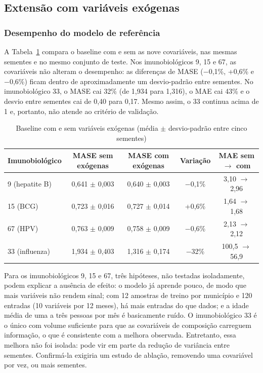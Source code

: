 \documentclass[
    12pt,
    openright,
    oneside,
    a4paper,
    english,
    brazil
]{abntex2}
\begin{document}
\subsection{Extensão com variáveis exógenas}
\label{sec:res_exogenas}

\subsubsection{Desempenho do modelo de referência}

A Tabela~\ref{tab:exogenas} compara o baseline com e sem as nove covariáveis, nas mesmas sementes e no mesmo conjunto de teste. Nos imunobiológicos 9, 15 e 67, as covariáveis não alteram o desempenho: as diferenças de MASE ($-$0,1\%, +0,6\% e $-$0,6\%) ficam dentro de aproximadamente um desvio-padrão entre sementes. No imunobiológico 33, o MASE cai 32\% (de 1,934 para 1,316), o MAE cai 43\% e o desvio entre sementes cai de 0,40 para 0,17. Mesmo assim, o 33 continua acima de 1 e, portanto, não atende ao critério de validação.

\begin{table}[htb]
  \centering
  \caption{Baseline com e sem variáveis exógenas (média $\pm$ desvio-padrão entre cinco sementes)}
  \label{tab:exogenas}
  \footnotesize
  \begin{tabular}{lcccc}
    \toprule
    \textbf{Imunobiológico} & \textbf{MASE sem exógenas} & \textbf{MASE com exógenas} & \textbf{Variação} & \textbf{MAE sem $\rightarrow$ com} \\
    \midrule
    9 (hepatite B) & 0,641 $\pm$ 0,003 & 0,640 $\pm$ 0,003 & $-$0,1\% & 3,10 $\rightarrow$ 2,96 \\
    15 (BCG) & 0,723 $\pm$ 0,016 & 0,727 $\pm$ 0,014 & +0,6\% & 1,64 $\rightarrow$ 1,68 \\
    67 (HPV) & 0,763 $\pm$ 0,009 & 0,758 $\pm$ 0,009 & $-$0,6\% & 2,13 $\rightarrow$ 2,12 \\
    33 (influenza) & 1,934 $\pm$ 0,403 & 1,316 $\pm$ 0,174 & $-$32\% & 100,5 $\rightarrow$ 56,9 \\
    \bottomrule
  \end{tabular}
\end{table}

Para os imunobiológicos 9, 15 e 67, três hipóteses, não testadas isoladamente, podem explicar a ausência de efeito: o modelo já aprende pouco, de modo que mais variáveis não rendem sinal; com 12 amostras de treino por município e 120 entradas (10 variáveis por 12 meses), há mais entradas do que dados; e a idade média de uma a três pessoas por mês é basicamente ruído. O imunobiológico 33 é o único com volume suficiente para que as covariáveis de composição carreguem informação, o que é consistente com a melhora observada. Entretanto, essa melhora não foi isolada: pode vir em parte da redução de variância entre sementes. Confirmá-la exigiria um estudo de ablação, removendo uma covariável por vez, ou mais sementes.
\end{document}
